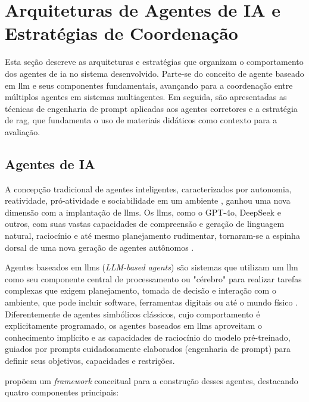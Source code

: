 \section{Arquiteturas de Agentes de IA e Estratégias de Coordenação}
\label{sec:agentes-rag}

Esta seção descreve as arquiteturas e estratégias que organizam o comportamento dos agentes de \gls{ia} no sistema desenvolvido. Parte-se do conceito de agente baseado em \gls{llm} e seus componentes fundamentais, avançando para a coordenação entre múltiplos agentes em sistemas multiagentes. Em seguida, são apresentadas as técnicas de engenharia de prompt aplicadas aos agentes corretores e a estratégia de \gls{rag}, que fundamenta o uso de materiais didáticos como contexto para a avaliação.

\subsection{Agentes de IA}

A concepção tradicional de agentes inteligentes, caracterizados por autonomia, reatividade, pró-atividade e sociabilidade em um ambiente \cite{wooldridge_introduction_2012}, ganhou uma nova dimensão com a implantação de \gls{llm}s. Os \gls{llm}s, como o GPT-4o, DeepSeek e outros, com suas vastas capacidades de compreensão e geração de linguagem natural, raciocínio e até mesmo planejamento rudimentar, tornaram-se a espinha dorsal de uma nova geração de agentes autônomos \cite{wang_survey_2025, xi_rise_2023}.

Agentes baseados em \gls{llm}s (\textit{LLM-based agents}) são sistemas que utilizam um \gls{llm} como seu componente central de processamento ou "cérebro" para realizar tarefas complexas que exigem planejamento, tomada de decisão e interação com o ambiente, que pode incluir software, ferramentas digitais ou até o mundo físico \cite{wang_survey_2025}. Diferentemente de agentes simbólicos clássicos, cujo comportamento é explicitamente programado, os agentes baseados em \gls{llm}s aproveitam o conhecimento implícito e as capacidades de raciocínio do modelo pré-treinado, guiados por prompts cuidadosamente elaborados (engenharia de prompt) para definir seus objetivos, capacidades e restrições.

 propõem um \textit{framework} conceitual para a construção desses agentes, destacando quatro componentes principais:

